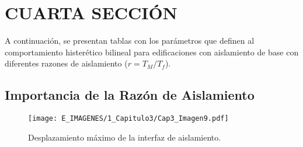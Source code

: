 \section{CUARTA SECCIÓN}

\lipsum[20]

A continuación, se presentan tablas con los parámetros que definen al comportamiento histerético bilineal para edificaciones con aislamiento de base con diferentes razones de aislamiento ($r=T_{M}/T_{f}$). 



	\subsection{Importancia de la Razón de Aislamiento}
	
	\lipsum[29]
	
	\begin{figure}[!h]
	\centering
		\texttt{[image: E\_IMAGENES/1\_Capitulo3/Cap3\_Imagen9.pdf]}
		\vspace{-3 mm}
	\caption[Desplazamiento máximo de la interfaz de aislamiento]{\centering\footnotesize Desplazamiento máximo de la interfaz de aislamiento.}
	\label{Cap3_Figura9}
	\end{figure}

